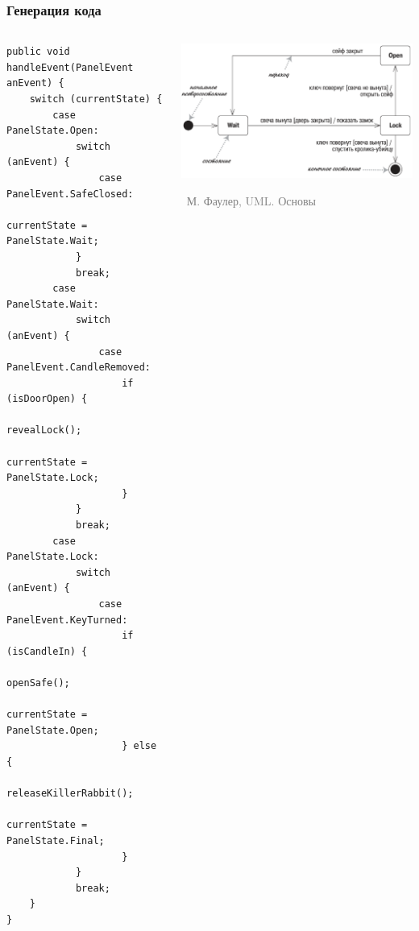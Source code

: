\documentclass[xetex,mathserif,serif]{beamer}
\newcommand{\attribution}[1] {
    \vspace{-5mm}\begin{flushright}\begin{scriptsize}\textcolor{gray}{\textcopyright\, #1}\end{scriptsize}\end{flushright}
}
\begin{document}
    \begin{frame}[fragile]
        \frametitle{Генерация кода}
        \begin{columns}
            \begin{column}{0.5\textwidth}
                \begin{tiny}
                    \begin{verbatim}
public void handleEvent(PanelEvent anEvent) {
    switch (currentState) {
        case PanelState.Open:
            switch (anEvent) {
                case PanelEvent.SafeClosed:
                    currentState = PanelState.Wait;
            }
            break;
        case PanelState.Wait:
            switch (anEvent) {
                case PanelEvent.CandleRemoved:
                    if (isDoorOpen) {
                        revealLock();
                        currentState = PanelState.Lock;
                    }
            }
            break;
        case PanelState.Lock:
            switch (anEvent) {
                case PanelEvent.KeyTurned:
                    if (isCandleIn) {
                        openSafe();
                        currentState = PanelState.Open;
                    } else {
                        releaseKillerRabbit();
                        currentState = PanelState.Final;
                    }
            }
            break;
    }
}
                    \end{verbatim}
                \end{tiny}
            \end{column}
            \begin{column}{0.5\textwidth}
                \begin{center}
                    \includegraphics[width=\textwidth]{stateTransitionSyntax.png}
                    \attribution{М. Фаулер, UML. Основы}
                \end{center}
            \end{column}
        \end{columns}
    \end{frame}
\end{document}
